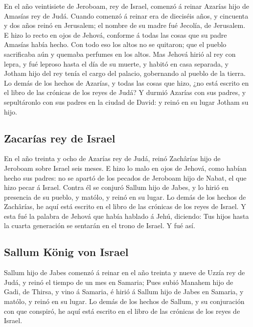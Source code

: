  En el año veintisiete de Jeroboam, rey de Israel, comenzó
á reinar Azarías hijo de Amasías rey de Judá.  Cuando
comenzó á reinar era de dieciséis años, y cincuenta y dos años reinó en
Jerusalem; el nombre de su madre fué Jecolía, de Jerusalem.
 E hizo lo recto en ojos de Jehová, conforme á todas las
cosas que su padre Amasías había hecho.  Con todo eso los
altos no se quitaron; que el pueblo sacrificaba aún y quemaba perfumes
en los altos.  Mas Jehová hirió al rey con lepra, y fué
leproso hasta el día de su muerte, y habitó en casa separada, y Jotham
hijo del rey tenía el cargo del palacio, gobernando al pueblo de la
tierra.  Lo demás de los hechos de Azarías, y todas las
cosas que hizo, ¿no está escrito en el libro de las crónicas de los
reyes de Judá?  Y durmió Azarías con sus padres, y
sepultáronlo con sus padres en la ciudad de David: y reinó en su lugar
Jotham su hijo.

\hypertarget{zacaruxedas-rey-de-israel}{%
\subsection{Zacarías rey de Israel}\label{zacaruxedas-rey-de-israel}}

 En el año treinta y ocho de Azarías rey de Judá, reinó
Zachârías hijo de Jeroboam sobre Israel seis meses.  E
hizo lo malo en ojos de Jehová, como habían hecho sus padres: no se
apartó de los pecados de Jeroboam hijo de Nabat, el que hizo pecar á
Israel.  Contra él se conjuró Sallum hijo de Jabes, y lo
hirió en presencia de su pueblo, y matólo, y reinó en su lugar.
 Lo demás de los hechos de Zachârías, he aquí está
escrito en el libro de las crónicas de los reyes de Israel.
 Y esta fué la palabra de Jehová que había hablado á
Jehú, diciendo: Tus hijos hasta la cuarta generación se sentarán en el
trono de Israel. Y fué así.

\hypertarget{sallum-kuxf6nig-von-israel}{%
\subsection{Sallum König von Israel}\label{sallum-kuxf6nig-von-israel}}

 Sallum hijo de Jabes comenzó á reinar en el año treinta
y nueve de Uzzía rey de Judá, y reinó el tiempo de un mes en Samaria;
 Pues subió Manahem hijo de Gadi, de Thirsa, y vino á
Samaria, é hirió á Sallum hijo de Jabes en Samaria, y matólo, y reinó en
su lugar.  Lo demás de los hechos de Sallum, y su
conjuración con que conspiró, he aquí está escrito en el libro de las
crónicas de los reyes de Israel.

